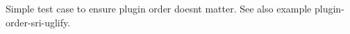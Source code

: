 Simple test case to ensure plugin order doesn\textquotesingle{}t matter. See also example {\ttfamily plugin-\/order-\/sri-\/uglify}. 